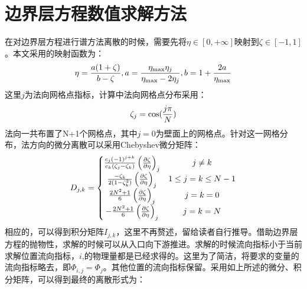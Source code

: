 \chapter{边界层方程数值求解方法}
\label{app:ble}
在对边界层方程进行谱方法离散的时候，需要先将$\eta\in[0,+\infty]$映射到$\zeta\in[-1,1]$。本文采用的映射函数为：
\begin{equation}\label{}
  \eta=\frac{a(1+\zeta)}{b-\zeta},a=\frac{\eta_{\rm max}\eta_j}{\eta_{\rm max}-2\eta_j},b=1+\frac{2a}{\eta_{\rm max}}
\end{equation}
这里$j$为法向网格点指标，计算中法向网格点分布采用：
\begin{equation}\label{}
  \zeta_j={\rm cos}(\frac{j\pi}{N})
\end{equation}
法向一共布置了N+1个网格点，其中$j=0$为壁面上的网格点。针对这一网格分布，法方向的微分离散可以采用Chebyshev微分矩阵：
\begin{equation}\label{}
  D_{j,k}=\left\{
  \begin{matrix}
    \frac{c_j(-1)^{j+k}}{c_k(\zeta_j-\zeta_k)}\left( \frac{\partial \zeta}{\partial \eta}\right)_j & j\not=k\\
    \frac{-\zeta_k}{2(1-\zeta_k^2)}\left( \frac{\partial \zeta}{\partial \eta}\right)_j &  1\leq j=k\leq N-1 \\
    \frac{2N^2+1}{6}\left( \frac{\partial \zeta}{\partial \eta}\right)_j &  j=k=0 \\
    -\frac{2N^2+1}{6}\left( \frac{\partial \zeta}{\partial \eta}\right)_j &  j=k=N
  \end{matrix}
  \right.
\end{equation}
相应的，可以得到积分矩阵$I_{j,k}$，这里不再赘述，留给读者自行推导。借助边界层方程的抛物性，求解的时候可以从入口向下游推进。求解的时候流向指标小于当前求解位置流向指标，$i$,的物理量都是已经求得的。这里为了简洁，将要求的变量的流向指标略去，即$\Phi_{i,j}=\Phi_{j}$。其他位置的流向指标保留。采用如上所述的微分、积分矩阵，可以得到最终的离散形式为：
